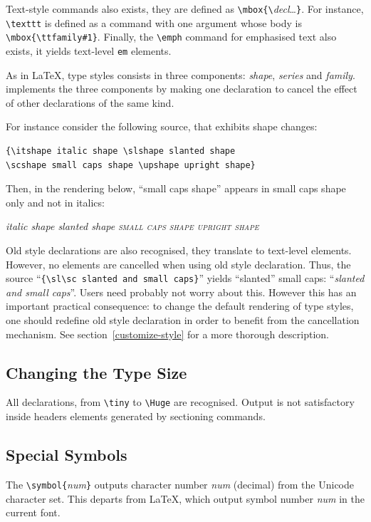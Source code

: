 Text-style commands also exists, they are defined as
\verb+\mbox{\+\textit{decl}\ldots\verb+}+. For instance,
\verb+\texttt+ is defined as a command with one argument whose body is
\verb+\mbox{\ttfamily#1}+.
Finally, the \verb+\emph+ command for emphasised text also exists,
it yields text-level \verb+em+ elements.


As in \LaTeX{}, type styles consists in three components:
\emph{shape}, \emph{series} and \emph{family}.
\hevea{} implements the three components by making one declaration to
cancel the effect of other declarations of the same kind.
\begin{htmlonly}
For instance consider the following source, that exhibits shape changes:
\begin{verbatim}
{\itshape italic shape \slshape slanted shape
\scshape small caps shape \upshape upright shape}
\end{verbatim}
Then, in the rendering below, ``small caps shape'' appears in small caps shape
only and not in italics:
\begin{htmlout}
{\itshape italic shape \slshape slanted shape
\scshape small caps shape \upshape upright shape}
\end{htmlout}
\end{htmlonly}


Old style declarations are also recognised, they translate to
text-level elements. However, no elements are cancelled when using
old style declaration. Thus, the source
``\verb+{\sl\sc slanted and small caps}+'' yields ``slanted''
small caps\ifhevea: ``{\sl\sc slanted and small caps}''\fi.
Users need probably not worry about this. However this has an
important practical consequence: to change the default rendering of
type styles, one should redefine old style declaration in order to
benefit from the cancellation mechanism. See
section~\ref{customize-style} for a more thorough description.


\subsection{Changing the Type Size}
All declarations, from \verb+\tiny+ to \verb+\Huge+ are recognised.
Output is not satisfactory inside headers elements
generated by sectioning commands.

\subsection{Special Symbols}

The \verb+\symbol{+{\it num}\verb+}+ outputs character number {\it num}
(decimal) from the Unicode character set.
This departs from \LaTeX{}, which output symbol number \textit{num} in
the current font.

